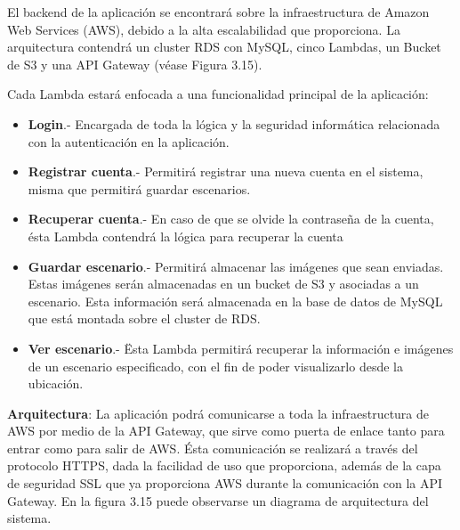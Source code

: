 El backend de la aplicación se encontrará sobre la infraestructura de Amazon Web Services (AWS), debido a la alta escalabilidad que proporciona. La arquitectura contendrá un cluster RDS con MySQL, cinco Lambdas, un Bucket de S3 y una API Gateway (véase Figura 3.15).\par
Cada Lambda estará enfocada a una funcionalidad principal de la aplicación:\par
\begin{itemize}
	\item\textbf{Login}.- Encargada de toda la lógica y la seguridad informática relacionada con la autenticación en la aplicación.
	\item\textbf{Registrar cuenta}.- Permitirá registrar una nueva cuenta en el sistema, misma que permitirá guardar escenarios.
	\item\textbf{Recuperar cuenta}.- En caso de que se olvide la contraseña de la cuenta, ésta Lambda contendrá la lógica para recuperar la cuenta
	\item\textbf{Guardar escenario}.- Permitirá almacenar las imágenes que sean enviadas. Estas imágenes serán almacenadas en un bucket de S3 y asociadas a un escenario. Esta información será almacenada en la base de datos de MySQL que está montada sobre el cluster de RDS.
	\item\textbf{Ver escenario}.- Ësta Lambda permitirá recuperar la información e imágenes de un escenario especificado, con el fin de poder visualizarlo desde la ubicación.
\end{itemize}
\noindent
\textbf{Arquitectura}:
La aplicación podrá comunicarse a toda la infraestructura de AWS por medio de la API Gateway, que sirve como puerta de enlace tanto para entrar como para salir de AWS. Ésta comunicación se realizará a través del protocolo HTTPS, dada la facilidad de uso que proporciona, además de la capa de seguridad SSL que ya proporciona AWS durante la comunicación con la API Gateway. En la figura 3.15 puede observarse un diagrama de arquitectura del sistema.
